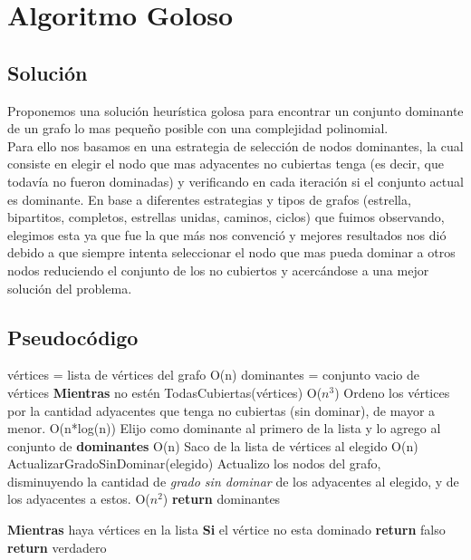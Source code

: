 \section{Algoritmo Goloso}

\subsection{Soluci\'on}

Proponemos una solución heurística golosa para encontrar un conjunto dominante de un grafo lo mas pequeño posible con una complejidad polinomial.\\
Para ello nos basamos en una estrategia de selección de nodos dominantes, la cual consiste en elegir el nodo que mas adyacentes no cubiertas tenga (es decir, que todavía no fueron dominadas) y verificando en cada iteración si el conjunto actual es dominante. En base a diferentes estrategias y tipos de grafos (estrella, bipartitos, completos, estrellas unidas, caminos, ciclos) que fuimos observando, elegimos esta ya que fue la que más nos convenció y mejores resultados nos dió debido a que siempre intenta seleccionar el nodo que mas pueda dominar a otros nodos reduciendo el conjunto de los no cubiertos y acercándose a una mejor solución del problema. 

\subsection{Pseudocódigo}

\begin{codebox}
\li	vértices = lista de vértices del grafo	\RComment O(n)
\li	dominantes = conjunto vacio de vértices	
\li	\textbf{Mientras} no estén TodasCubiertas(vértices) \Do \RComment O($n^3$)
\li 		Ordeno los vértices por la cantidad adyacentes que tenga no cubiertas (sin dominar), de mayor a menor. \RComment O(n*log(n))
\li 		Elijo como dominante al primero de la lista y lo agrego al conjunto de \textbf{dominantes} \RComment O(n)
\li 		Saco de la lista de vértices al elegido \RComment O(n)
\li 		ActualizarGradoSinDominar(elegido) \RComment Actualizo los nodos del grafo,\\ disminuyendo la cantidad de \textit{grado sin dominar} de los adyacentes al elegido, y de los adyacentes a estos.  O($n^2$)
\End
\li	\textbf{return} dominantes
\end{codebox}

\begin{codebox}
\li 	\textbf{Mientras} haya vértices en la lista \Do
\li 		\textbf{Si} el vértice no esta dominado \Do
\li 			\textbf{return} falso \End \End
\li 	\textbf{return} verdadero
\end{codebox}

